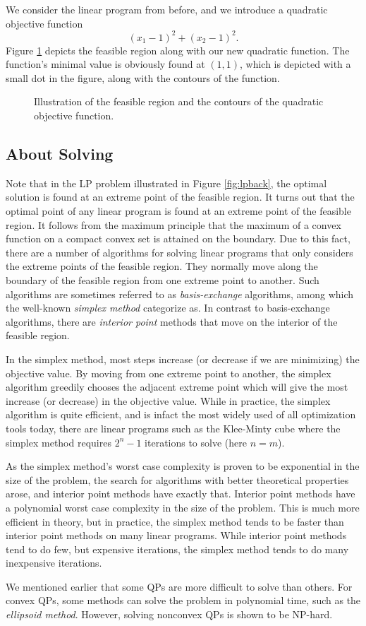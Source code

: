 We consider the linear program from before, and we introduce a quadratic
objective function
\[
(x_1 - 1)^2 + (x_2 - 1)^2.
\]
Figure \ref{fig:qpback} depicts the feasible region along with our new
quadratic function.
The function's minimal value is obviously found at $(1,1)$, which is
depicted with a small dot in the figure, along with the contours of the
function.
\begin{figure}[ht!]
\centering

\caption{Illustration of the feasible region and the contours of the quadratic
         objective function.}
\label{fig:qpback}
\end{figure}

\subsection{About Solving}
Note that in the LP problem illustrated in Figure \ref{fig:lpback},
the optimal solution is found at an extreme point
of the feasible region. It turns out that the optimal point of any linear program is
found at an extreme point of the feasible region.
It follows from the maximum principle that the maximum of a convex function on
a compact convex set is attained on the boundary\cite{rockafellar}.
Due to this fact, there are a number of algorithms for solving linear
programs that only considers the extreme points of the feasible region.
They normally move along the boundary of the feasible region from one extreme
point to another.
Such algorithms are sometimes referred to as \textit{basis-exchange} algorithms,
among which the well-known \textit{simplex method} categorize as.
In contrast to basis-exchange algorithms, there are \textit{interior point} methods
that move on the interior of the feasible region.

In the simplex method, most steps increase (or decrease if we are minimizing) the
objective value. By moving from one extreme point to another, the simplex algorithm
greedily chooses the adjacent extreme point which will give the most increase
(or decrease) in the objective value. 
While in practice, the simplex algorithm is quite efficient, and is infact
the most widely used of all optimization tools today\cite{nocedal}, there are
linear programs such as the Klee-Minty cube\cite{klee} where the simplex method
requires $2^n - 1$ iterations to solve (here $n = m$).

As the simplex method's worst case complexity is proven to be exponential
in the size of the problem, the search for algorithms with better theoretical
properties arose, and interior point methods have exactly that.
Interior point methods have a polynomial worst case
complexity in the size of the problem. This is much more efficient in
theory, but in practice, the simplex method tends to be faster than interior
point methods on many linear programs. While interior point methods tend
to do few, but expensive iterations, the simplex method tends to do
many inexpensive iterations.

We mentioned earlier that some QPs are more difficult to solve than others.
For convex QPs, some methods can solve the problem in polynomial time, such
as the \textit{ellipsoid method}\cite{kozlov}. However, solving nonconvex
QPs is shown to be NP-hard\cite{sahni}.
